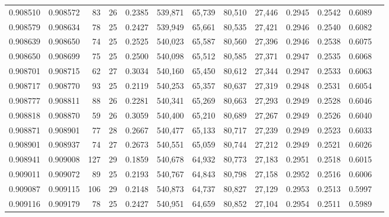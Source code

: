 \begin{tabular}{rrrrrrrrrrrrr}
0.908510 & 0.908572 &    83 &  26 &                                     0.2385 & 539,871 &  65,739 &  80,510 &  27,446 & 0.2945 & 0.2542 & 0.6089 \\
0.908579 & 0.908634 &    78 &  25 &                                     0.2427 & 539,949 &  65,661 &  80,535 &  27,421 & 0.2946 & 0.2540 & 0.6082 \\
0.908639 & 0.908650 &    74 &  25 &                                     0.2525 & 540,023 &  65,587 &  80,560 &  27,396 & 0.2946 & 0.2538 & 0.6075 \\
0.908650 & 0.908699 &    75 &  25 &                                     0.2500 & 540,098 &  65,512 &  80,585 &  27,371 & 0.2947 & 0.2535 & 0.6068 \\
0.908701 & 0.908715 &    62 &  27 &                                     0.3034 & 540,160 &  65,450 &  80,612 &  27,344 & 0.2947 & 0.2533 & 0.6063 \\
0.908717 & 0.908770 &    93 &  25 &                                     0.2119 & 540,253 &  65,357 &  80,637 &  27,319 & 0.2948 & 0.2531 & 0.6054 \\
0.908777 & 0.908811 &    88 &  26 &                                     0.2281 & 540,341 &  65,269 &  80,663 &  27,293 & 0.2949 & 0.2528 & 0.6046 \\
0.908818 & 0.908870 &    59 &  26 &                                     0.3059 & 540,400 &  65,210 &  80,689 &  27,267 & 0.2949 & 0.2526 & 0.6040 \\
0.908871 & 0.908901 &    77 &  28 &                                     0.2667 & 540,477 &  65,133 &  80,717 &  27,239 & 0.2949 & 0.2523 & 0.6033 \\
0.908901 & 0.908937 &    74 &  27 &                                     0.2673 & 540,551 &  65,059 &  80,744 &  27,212 & 0.2949 & 0.2521 & 0.6026 \\
0.908941 & 0.909008 &   127 &  29 &                                     0.1859 & 540,678 &  64,932 &  80,773 &  27,183 & 0.2951 & 0.2518 & 0.6015 \\
0.909011 & 0.909072 &    89 &  25 &                                     0.2193 & 540,767 &  64,843 &  80,798 &  27,158 & 0.2952 & 0.2516 & 0.6006 \\
0.909087 & 0.909115 &   106 &  29 &                                     0.2148 & 540,873 &  64,737 &  80,827 &  27,129 & 0.2953 & 0.2513 & 0.5997 \\
0.909116 & 0.909179 &    78 &  25 &                                     0.2427 & 540,951 &  64,659 &  80,852 &  27,104 & 0.2954 & 0.2511 & 0.5989 \\

\end{tabular}

